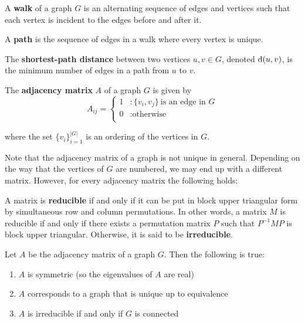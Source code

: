 \begin{definition}
  A \textbf{walk} of a graph $G$ is an alternating sequence of edges and vertices such that each
  vertex is incident to the edges before and after it.

  A \textbf{path} is the sequence of edges in a walk where every vertex is unique.

  The \textbf{shortest-path distance} between two vertices $u,v \in G$, denoted $\mathrm{d}(u,v)$, is the
  minimum number of edges in a path from $u$ to $v$.
\end{definition}

\begin{definition}
  The \textbf{adjacency matrix} $A$ of a graph $G$ is given by
  \[
    A_{ij} = \begin{cases}
      1 &: \{v_i,v_j\} ~\text{is an edge in $G$} \\
      0 &: \text{otherwise} \\
    \end{cases}
  \]

  where the set $\{v_i\}_{i=1}^{|G|}$ is an ordering of the vertices in $G$.
\end{definition}
 

Note that the adjacency matrix of a graph is not unique in general. Depending on
the way that the vertices of $G$ are numbered, we may end up with a different
matrix. However, for every adjacency matrix the following holds:


\begin{definition}
  A matrix is \textbf{reducible} if and only if it can be put in block upper triangular
  form by simultaneous row and column permutations. In other words, a matrix $M$
  is reducible if and only if there exists a permutation matrix $P$ such that
  $P^{-1}MP$ is block upper triangular. Otherwise, it is said to be
  \textbf{irreducible}.
\end{definition}

\begin{proposition}
  Let $A$ be the adjacency matrix of a graph $G$. Then the following is true:

  \begin{enumerate}
  \item $A$ is symmetric (so the eigenvalues of $A$ are real)
  \item $A$ corresponds to a graph that is unique up to equivalence
  \item $A$ is irreducible if and only if $G$ is connected
  \end{enumerate}
\end{proposition}

